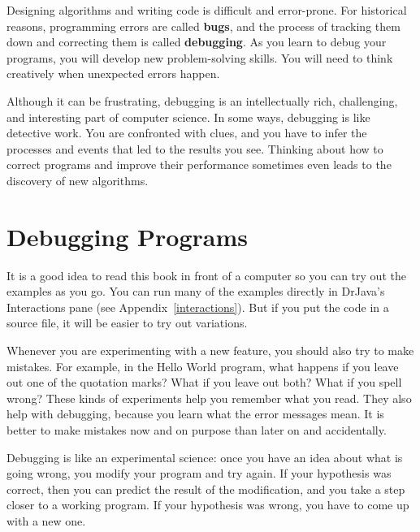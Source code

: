 
Designing algorithms and writing code is difficult and error-prone.
For historical reasons, programming errors are called {\bf bugs}, and the process of tracking them down and correcting them is called {\bf debugging}.
As you learn to debug your programs, you will develop new problem-solving skills.
You will need to think creatively when unexpected errors happen.

Although it can be frustrating, debugging is an intellectually rich, challenging, and interesting part of computer science.
In some ways, debugging is like detective work.
You are confronted with clues, and you have to infer the processes and events that led to the results you see.
Thinking about how to correct programs and improve their performance sometimes even leads to the discovery of new algorithms.


\section{Debugging Programs}
\label{sec:examples}

It is a good idea to read this book in front of a computer so you can try out the examples as you go.
You can run many of the examples directly in DrJava's Interactions pane (see Appendix~\ref{interactions}).
But if you put the code in a source file, it will be easier to try out variations.


Whenever you are experimenting with a new feature, you should also try to make mistakes.
For example, in the Hello World program, what happens if you leave out one of the quotation marks?
What if you leave out both?
What if you spell  wrong?
These kinds of experiments help you remember what you read.
They also help with debugging, because you learn what the error messages mean.
It is better to make mistakes now and on purpose than later on and accidentally.



Debugging is like an experimental science: once you have an idea about what is going wrong, you modify your program and try again.
If your hypothesis was correct, then you can predict the result of the modification, and you take a step closer to a working program.
If your hypothesis was wrong, you have to come up with a new one.


